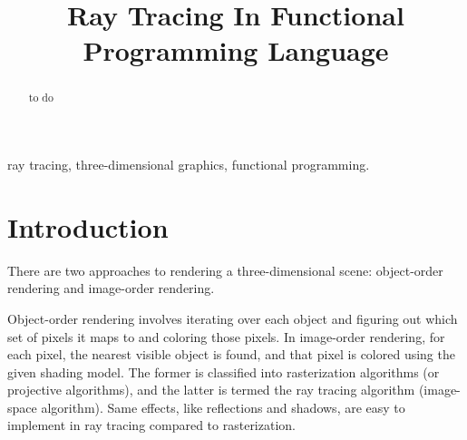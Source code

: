 \documentclass[conference]{IEEEtran}
\begin{document}
\title{Ray Tracing In Functional Programming Language\\

}

\author{
\and
{}
\and
{}
}

\maketitle

\begin{abstract}
to do
\end{abstract}

\begin{IEEEkeywords}
ray tracing, three-dimensional graphics, functional programming.
\end{IEEEkeywords}

\section{Introduction}

There are two approaches to rendering a three-dimensional scene: object-order rendering and image-order rendering. 

Object-order rendering involves iterating over each object and figuring out which set of pixels it maps to and coloring those pixels.
In image-order rendering, for each pixel, the nearest visible object is found, and that pixel is colored using the given shading model. 
The former is classified into rasterization algorithms (or projective algorithms), and the latter is termed the ray tracing algorithm (image-space algorithm). Same effects, like reflections and shadows, are easy to implement in ray tracing compared to rasterization.
\end{document}
